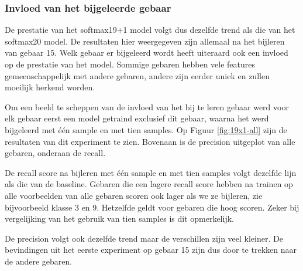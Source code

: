 \subsubsection{Invloed van het bijgeleerde gebaar}

De prestatie van het softmax19+1 model volgt dus dezelfde trend als die van het softmax20 model. De resultaten hier weergegeven zijn allemaal na het bijleren van gebaar 15. Welk gebaar er bijgeleerd wordt heeft uiteraard ook een invloed op de prestatie van het model. Sommige gebaren hebben vele features gemeenschappelijk met andere gebaren, andere zijn eerder uniek en zullen moeilijk herkend worden.

\npar Om een beeld te scheppen van de invloed van het bij te leren gebaar werd voor elk gebaar eerst een model getraind exclusief dit gebaar, waarna het werd bijgeleerd met \'e\'en sample en met tien samples. Op Figuur \ref{fig:19x1-all} zijn de resultaten van dit experiment te zien. Bovenaan is de precision uitgeplot van alle gebaren, onderaan de recall.

\npar De recall score na bijleren met \'e\'en sample en met tien samples volgt dezelfde lijn als die van de baseline. Gebaren die een lagere recall score hebben na trainen op alle voorbeelden van alle gebaren scoren ook lager als we ze bijleren, zie bijvoorbeeld klasse 3 en 9. Hetzelfde geldt voor gebaren die hoog scoren. Zeker bij vergelijking van het gebruik van tien samples is dit opmerkelijk.

\npar De precision volgt ook dezelfde trend maar de verschillen zijn veel kleiner. De bevindingen uit het eerste experiment op gebaar 15 zijn dus door te trekken naar de andere gebaren.

